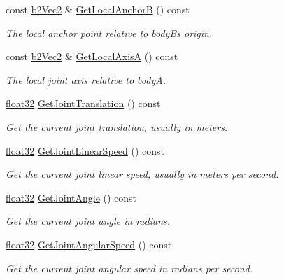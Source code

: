 \begin{DoxyCompactItemize}
const \mbox{\hyperlink{structb2_vec2}{b2\+Vec2}} \& \mbox{\hyperlink{classb2_wheel_joint_a78c56833f42bfc61998aa5ea8c876f3e}{Get\+Local\+AnchorB}} () const
\begin{DoxyCompactList}\small\item\em The local anchor point relative to bodyB\textquotesingle{}s origin. \end{DoxyCompactList}\item 
const \mbox{\hyperlink{structb2_vec2}{b2\+Vec2}} \& \mbox{\hyperlink{classb2_wheel_joint_a86bf4dbf356f9095c05d62313810e602}{Get\+Local\+AxisA}} () const
\begin{DoxyCompactList}\small\item\em The local joint axis relative to bodyA. \end{DoxyCompactList}\item 
\mbox{\hyperlink{b2_settings_8h_aacdc525d6f7bddb3ae95d5c311bd06a1}{float32}} \mbox{\hyperlink{classb2_wheel_joint_a4cebb70f659344d5d93c1885d47000e3}{Get\+Joint\+Translation}} () const
\begin{DoxyCompactList}\small\item\em Get the current joint translation, usually in meters. \end{DoxyCompactList}\item 
\mbox{\hyperlink{b2_settings_8h_aacdc525d6f7bddb3ae95d5c311bd06a1}{float32}} \mbox{\hyperlink{classb2_wheel_joint_a3cbdc95c55c9bf5b9f2b46b05fc2a5e5}{Get\+Joint\+Linear\+Speed}} () const
\begin{DoxyCompactList}\small\item\em Get the current joint linear speed, usually in meters per second. \end{DoxyCompactList}\item 
\mbox{\hyperlink{b2_settings_8h_aacdc525d6f7bddb3ae95d5c311bd06a1}{float32}} \mbox{\hyperlink{classb2_wheel_joint_a3ea115dde9bad34d23fd59068734824a}{Get\+Joint\+Angle}} () const
\begin{DoxyCompactList}\small\item\em Get the current joint angle in radians. \end{DoxyCompactList}\item 
\mbox{\hyperlink{b2_settings_8h_aacdc525d6f7bddb3ae95d5c311bd06a1}{float32}} \mbox{\hyperlink{classb2_wheel_joint_aaf5a4e3713ceca98c2afda950e67ff9d}{Get\+Joint\+Angular\+Speed}} () const
\begin{DoxyCompactList}\small\item\em Get the current joint angular speed in radians per second. \end{DoxyCompactList}\item 

\end{DoxyCompactItemize}
